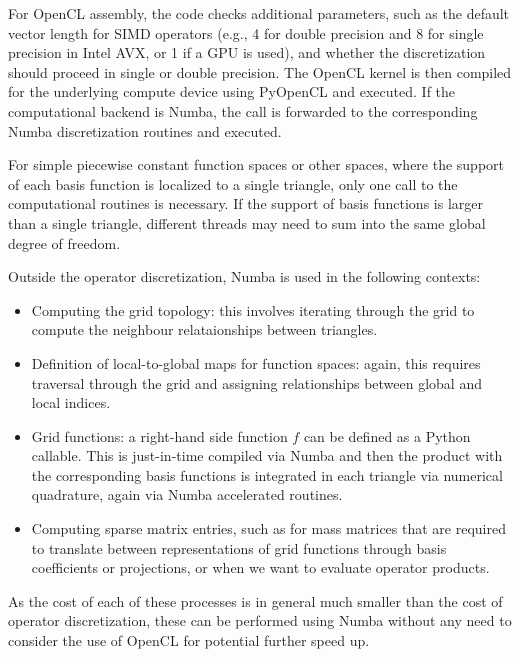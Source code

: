 For OpenCL assembly, the code checks additional parameters, such as the default vector length for SIMD operators (e.g., 4 for double precision and 8 for single precision in Intel AVX, or 1 if a GPU is used), and whether the discretization should proceed in single or double precision. The OpenCL kernel is then compiled for the underlying compute device using PyOpenCL and executed. If the computational backend is Numba, the call is forwarded to the corresponding Numba discretization routines and executed.

For simple piecewise constant function spaces or other spaces, where the support of each basis function is localized to a single triangle, only one call to the computational routines is necessary. If the support of basis functions is larger than a single triangle, different threads may need to sum into the same global degree of freedom.

Outside the operator discretization, Numba is used in the following contexts:
\begin{itemize}
  \item Computing the grid topology: this involves iterating through the grid to compute the neighbour relataionships between triangles.
  \item Definition of local-to-global maps for function spaces: again, this requires traversal through the grid and assigning relationships between global and local indices.
  \item Grid functions: a right-hand side function $f$ can be defined as a Python callable. This is just-in-time compiled via Numba and then the product with the corresponding basis functions is integrated in each triangle via numerical quadrature, again via Numba accelerated routines.
  \item Computing sparse matrix entries, such as for mass matrices that are required to translate between representations of grid functions through basis coefficients or projections, or when we want to evaluate operator products.
\end{itemize}

As the cost of each of these processes is in general much smaller than the cost of operator discretization, these can be performed using Numba without any need to consider the use of OpenCL for potential further speed up.
